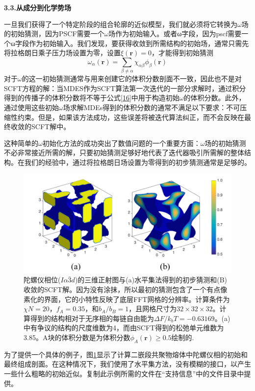 \documentclass[12pt，a4paper]{article}
\numberwithin{equation}{section}
\begin{document}
\textbf{3.3.从成分到化学势场}

一旦我们获得了一个特定阶段的组合轮廓的近似模型，我们就必须将它转换为$\omega$场的初始猜测，因为PSCF需要一个$\omega$场作为初始输入。或者ω字段，因为pscf需要一个ω字段作为初始输入。我们发现，要获得收敛到所需结构的初始场，通常只需先将拉格朗日乘子压力场设置为零，设置$\xi(\mathbf{r})=0$，才能得到初始猜测
\begin{equation}\label{16}
\omega _{\alpha}(\mathbf{r})=\sum _{\beta \neq \alpha} \chi _{\alpha \beta} \phi _{\beta}(\mathbf{r})
\end{equation}
对于$\omega$的这一初始猜测通常与用来创建它的体积分数剖面不一致，因此也不是对SCFT方程的解：当MDES作为SCFT算法第一次迭代的一部分求解时，通过积分得到的传播子的体积分数将不等于公式\ref{16}中用于构造初始$\omega$的体积分数。此外，通过使用这些初始$\omega$场求解MDEs得到的体积分数的通常不满足以下要求：不可压缩性约束。但是，如果该方法成功，这些误差将被迭代算法纠正，而不会反映在最终收敛的SCFT解中。

这种简单的$\omega$初始化方法的成功突出了数值问题的一个重要方面：$\omega$场的初始猜测不必非常接近所需的解，只要初始猜测足够好地代表了迭代器吸引所需解的整体结构。在我们的经验中，通过将拉格朗日场设置为零得到的初步猜测通常是足够的。
\begin{figure}[H]
\centering
\includegraphics[scale=0.5]{./figures/2.png}
\caption{陀螺仪相位($I\alpha \bar{3}d$)的三维正射图与(a)水平集法得到的初步猜测和(B)收敛的SCFT解。因为没有涂抹，所以最初的猜测包含了一个有点像素化的界面，它的小特性反映了底层FFT网格的分辨率。计算条件为$\chi N=20，f_A =0.35$，和$b_A/b_B=1$，且网格尺寸为$32\times 32\times 32$。计算得到的结构相对于无序相的每链自由能为$\Delta F /k_b T =-0.63169$。(a)中有争议的结构的尺度维数为4，而由SCFT得到的松弛单元维数为3.85。A块的体积分数是为体积分数$\phi _A(\mathbf{r})\geqslant 0.5$绘制的.
}
\label{图2}
\end{figure}
为了提供一个具体的例子，图\ref{图2}显示了计算二嵌段共聚物熔体中陀螺仪相的初始和最终组成剖面。在这种情况下，我们使用了水平集方法，没有模糊的接口，以产生一些什么粗略的初始近似。复制此示例所需的文件在“支持信息”中的文件目录中提供。
\end{document}
